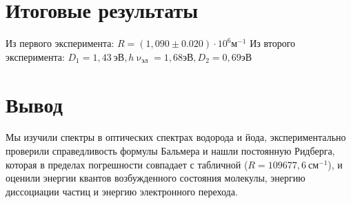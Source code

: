 \documentclass[14pt, a4paper]{extarticle}
\begin{document}
 \section{Итоговые результаты}
 Из первого эксперимента: $R = (1,090 \pm 0.020)\cdot 10^6м^{-1}$
 Из второго эксперимента: $D_1 = 1,43\ эВ, h\upnu_{эл} = 1,68эВ, D_2 = 0,69эВ $
 \section{Вывод}
 Мы изучили спектры в оптических спектрах водорода и йода, экспериментально проверили справедливость формулы Бальмера и нашли постоянную Ридберга, которая в пределах погрешности совпадает с табличной ($ R = 109 677,6 \ см^{-1} $), и оценили энергии квантов возбужденного состояния молекулы, энергию диссоциации частиц и энергию электронного перехода.
	
\end{document}
